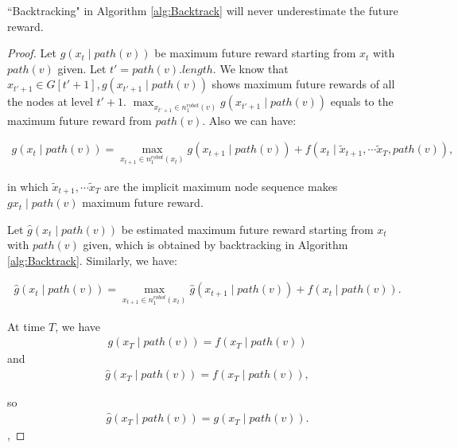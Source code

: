 \documentclass[12pt]{article}
\begin{document}
\begin{propty}
\label{prop:underestimate}
``Backtracking" in Algorithm \ref{alg:Backtrack} will never underestimate the future reward.
\begin{proof}

Let $ g(x_{t} \mid path(v)) $ be maximum future reward starting from $ x_{t} $ with $ path(v) $ given. Let $ t' = path(v).length $. We know that $ x_{t'+1} \in G[t'+1], g(x_{t'+1} \mid path(v)) $ shows maximum future rewards of all the nodes at level $ t'+1 $. $ \max_{x_{t'+1} \in n^{robot}_{1}(v)} g(x_{t'+1} \mid path(v)) $ equals to the maximum future reward from $ path(v) $. Also we can have:

\begin{equation}
\begin{aligned}
g(x_{t} \mid path(v)) = \max_{x_{t+1} \in n^{robot}_{1}(x_{t})} g(x_{t+1} \mid path(v)) + f(x_{t} \mid \tilde{x}_{t+1}, \cdots \tilde{x}_{T}, path(v)),
\end{aligned}
\end{equation}

in which $ \tilde{x}_{t+1}, \cdots \tilde{x}_{T} $ are the implicit maximum node sequence makes $ g{x_{t} \mid path(v)} $ maximum future reward. 

Let $ \hat{g}(x_{t} \mid path(v)) $ be estimated maximum future reward starting from $ x_{t} $ with $ path(v) $ given, which is obtained by backtracking in Algorithm \ref{alg:Backtrack}. Similarly, we have:

\begin{equation}
\begin{aligned}
\hat{g}(x_{t} \mid path(v)) = \max_{x_{t+1} \in n^{robot}_{1}(x_{t})} \hat{g}(x_{t+1} \mid path(v)) + f(x_{t} \mid path(v)).
\end{aligned}
\end{equation}

At time $ T $, we have
\begin{equation}
\begin{aligned}
g(x_{T} \mid path(v)) = f(x_{T} \mid path(v))
\end{aligned}
\end{equation}
and
\begin{equation}
\begin{aligned}
\hat{g}(x_{T} \mid path(v)) = f(x_{T} \mid path(v)),
\end{aligned}
\end{equation}

so 
\begin{equation}
\label{eq:inductionInit}
\begin{aligned}
\hat{g}(x_{T} \mid path(v)) = g(x_{T} \mid path(v)).
\end{aligned}
\end{equation},


\end{proof}
\end{propty}
\end{document}
